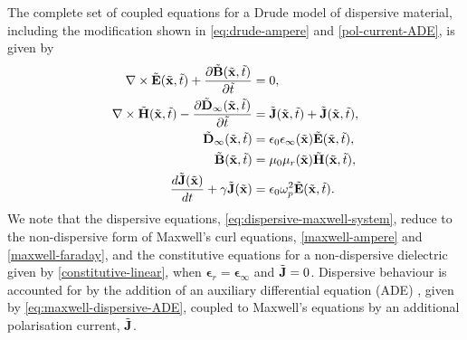 The complete set of coupled equations for a Drude model of dispersive material, including the modification shown in \eqref{eq:drude-ampere} and \eqref{pol-current-ADE}, is given by
\begin{subequations}
    \label{eq:dispersive-maxwell-system}
    \begin{align}
        \nabla \times \tilde{\mathbf{E}}(\tilde{\mathbf{x}},\tilde{t}) + \frac{\partial \tilde{\mathbf{B}}(\tilde{\mathbf{x}}, \tilde{t})}{\partial \tilde{t}}&= 0, \\
        \nabla \times \tilde{\mathbf{H}}(\tilde{\mathbf{x}},\tilde{t}) - \frac{\partial \tilde{\mathbf{D}}_{\infty}(\tilde{\mathbf{x}}, \tilde{t}) }{\partial \tilde{t}}&= \tilde{\mathbf{J}}(\tilde{\mathbf{x}},\tilde{t}) + \tilde{\mathbf{J}}(\tilde{\mathbf{x}},\tilde{t}), \\
        \tilde{\mathbf{D}}_{\infty}(\tilde{\mathbf{x}},\tilde{t}) &= \epsilon_0 \epsilon_{\infty}(\tilde{\mathbf{x}}) \tilde{\mathbf{E}}(\tilde{\mathbf{x}},\tilde{t}), \\
        \tilde{\mathbf{B}}(\tilde{\mathbf{x}},\tilde{t}) &= \mu_0 \mu_r(\tilde{\mathbf{x}}) \tilde{\mathbf{H}}(\tilde{\mathbf{x}},\tilde{t}), \\
        \frac{d \tilde{\mathbf{J}}(\tilde{\mathbf{x}})}{dt} + \gamma \tilde{\mathbf{J}}(\tilde{\mathbf{x}}) &= \epsilon_0 \omega_p^2 \tilde{\mathbf{E}}(\tilde{\mathbf{x}}, \tilde{t}) . \label{eq:maxwell-dispersive-ADE}
    \end{align}
\end{subequations}
%
We note that the dispersive equations, \eqref{eq:dispersive-maxwell-system}, reduce to the non-dispersive form of Maxwell's curl equations, \eqref{maxwell-ampere} and \eqref{maxwell-faraday}, and the constitutive equations for a non-dispersive dielectric given by \eqref{constitutive-linear}, when $\mathbf{\epsilon}_r = \mathbf{\epsilon}_{\infty}$ and $\tilde{\mathbf{J}} = 0$. Dispersive behaviour is accounted for by the addition of an auxiliary differential equation (ADE) \cite{Taflove:1989ds,Niegemann:2009uv,Ji:2007dl}, given by \eqref{eq:maxwell-dispersive-ADE}, coupled to Maxwell's equations by an additional polarisation current, $\tilde{\mathbf{J}}$.

